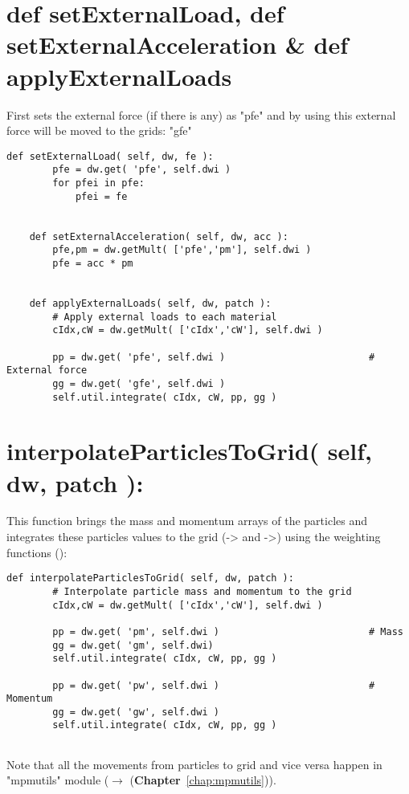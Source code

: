 \documentclass[11pt,fleqn]{book} %
\begin{document}
\section{def setExternalLoad, def setExternalAcceleration \& def applyExternalLoads}
First \TT[setExternalLoad] sets the external force (if there is any) as "pfe" and by using  this external force will be moved to the grids: "gfe"
\begin{lstlisting}
def setExternalLoad( self, dw, fe ):
        pfe = dw.get( 'pfe', self.dwi )
        for pfei in pfe:
            pfei = fe
                
                
    def setExternalAcceleration( self, dw, acc ):
        pfe,pm = dw.getMult( ['pfe','pm'], self.dwi )
        pfe = acc * pm


    def applyExternalLoads( self, dw, patch ):
        # Apply external loads to each material
        cIdx,cW = dw.getMult( ['cIdx','cW'], self.dwi )
        
        pp = dw.get( 'pfe', self.dwi )                         # External force
        gg = dw.get( 'gfe', self.dwi )        
        self.util.integrate( cIdx, cW, pp, gg )         
\end{lstlisting}
\section{interpolateParticlesToGrid( self, dw, patch ):}
This function brings the mass and momentum arrays of the particles and integrates these particles values to the grid (-> and ->) using the weighting functions ():
\begin{lstlisting}
def interpolateParticlesToGrid( self, dw, patch ):
        # Interpolate particle mass and momentum to the grid
        cIdx,cW = dw.getMult( ['cIdx','cW'], self.dwi )     

        pp = dw.get( 'pm', self.dwi )                          # Mass
        gg = dw.get( 'gm', self.dwi)
        self.util.integrate( cIdx, cW, pp, gg )
        
        pp = dw.get( 'pw', self.dwi )                          # Momentum
        gg = dw.get( 'gw', self.dwi )
        self.util.integrate( cIdx, cW, pp, gg )            
        
\end{lstlisting}

Note that all the movements from particles to grid and vice versa happen in "mpmutils" module ($\rightarrow$ (\textbf{Chapter}~\ref{chap:mpmutils})).
\end{document}
